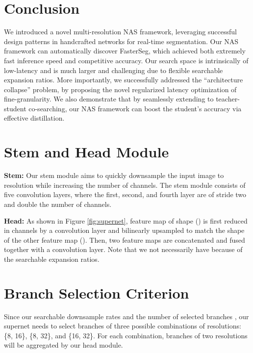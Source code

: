 \documentclass{article} \usepackage{iclr2020_conference,times}
\begin{document}
\section{Conclusion}\vspace{-0.5em}
We introduced a novel multi-resolution NAS framework, leveraging successful design patterns in handcrafted networks for real-time segmentation. Our NAS framework can automatically discover FasterSeg, which achieved both extremely fast inference speed and competitive accuracy. Our search space is intrinsically of low-latency and is much larger and challenging due to flexible searchable expansion ratios. More importantly, we successfully addressed the ``architecture collapse'' problem, by proposing the novel regularized latency optimization of fine-granularity. We also demonstrate that by seamlessly extending to teacher-student co-searching, our NAS framework can boost the student's accuracy via effective distillation.




\newpage
\appendix

\section{Stem and Head Module}\vspace{-0.7em}
\textbf{Stem:} Our stem module aims to quickly downsample the input image to  resolution while increasing the number of channels. The stem module consists of five  convolution layers, where the first, second, and fourth layer are of stride two and double the number of channels.

\textbf{Head:} As shown in Figure \ref{fig:supernet}, feature map of shape () is first reduced in channels by a  convolution layer and bilinearly upsampled to match the shape of the other feature map (). Then, two feature maps are concatenated and fused together with a  convolution layer. Note that we not necessarily have  because of the searchable expansion ratios.


\section{Branch Selection Criterion}\vspace{-0.7em} \label{app:branch_selection_mnasnet}
Since our searchable downsample rates  and the number of selected branches , our supernet needs to select branches of three possible combinations of resolutions: \{8, 16\}, \{8, 32\}, and \{16, 32\}. For each combination, branches of two resolutions will be aggregated by our head module.
\end{document}
